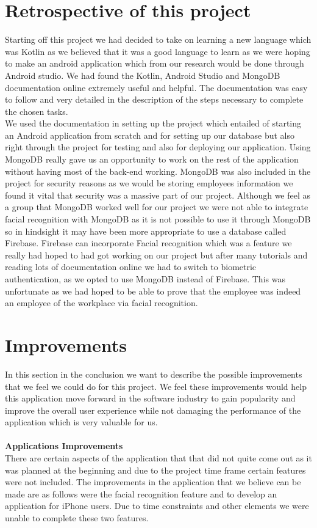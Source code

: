 \section{Retrospective of this project}
Starting off this project we had decided to take on learning a new language which was Kotlin as we believed that it was a good language to learn as we were hoping to make an android application which from our research would be done through Android studio. We had found the Kotlin, Android Studio and MongoDB documentation online extremely useful and helpful. The documentation was easy to follow and very detailed in the description of the steps necessary to complete the chosen tasks.
\\
We used the documentation in setting up the project which entailed of starting an Android application from scratch and for setting up our database but also right through the project for testing and also for deploying our application. Using MongoDB really gave us an opportunity to work on the rest of the application without having most of the back-end working. MongoDB was also included in the project for security reasons as we would be storing employees information we found it vital that security was a massive part of our project. Although we feel as a group that MongoDB worked well for our project we were not able to integrate facial recognition with MongoDB as it is not possible to use it through MongoDB so in hindsight it may have been more appropriate to use a database called Firebase. Firebase can incorporate Facial recognition which was a feature we really had hoped to had got working on our project but after many tutorials and reading lots of documentation online we had to switch to biometric authentication, as we opted to use MongoDB instead of Firebase. This was unfortunate as we had hoped to be able to prove that the employee was indeed an employee of the workplace via facial recognition.
\section{Improvements}
In this section in the conclusion we want to describe the possible improvements that we feel we could do for this project. We feel these improvements would help this application move forward in the software industry to gain popularity and improve the overall user experience while not damaging the performance of the application which is very valuable for us.
\\
\\
\textbf{Applications Improvements}
\\
There are certain aspects of the application that that did not quite come out as it was planned at the beginning and due to the project time frame certain features were not included. The improvements in the application that we believe can be made are as follows were the facial recognition feature and to develop an application for iPhone users. Due to time constraints and other elements we were unable to complete these two features. 

